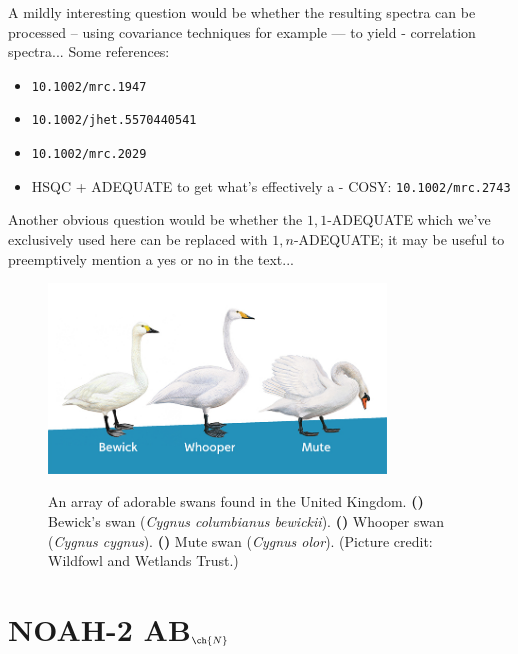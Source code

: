 \documentclass[a4paper,12pt]{article}
\newcommand{\carbon}{\ch{^{13}C}}
\newcommand{\nitrogen}{\ch{^{15}N}}
\newcommand{\todo}[1]{{\color{OrangeRed}#1}}
\begin{document}
\begin{refsection}
\todo{
    A mildly interesting question would be whether the resulting spectra can be processed -- using covariance techniques for example --- to yield \carbon{}-\nitrogen{} correlation spectra... Some references:

    \begin{itemize}
        \item \texttt{10.1002/mrc.1947}
        \item \texttt{10.1002/jhet.5570440541}
        \item \texttt{10.1002/mrc.2029}
        \item HSQC + ADEQUATE to get what's effectively a \carbon{}-\carbon{} COSY: \texttt{10.1002/mrc.2743}
    \end{itemize}

    Another obvious question would be whether the $1,1$-ADEQUATE which we've exclusively used here can be replaced with $1,n$-ADEQUATE; it may be useful to preemptively mention a yes or no in the text...
}

\begin{figure}[ht]
    \centering
    \includegraphics[width=0.8\textwidth]{swans.jpeg}
    {\label{fig:swans_bewick}}
    {\label{fig:swans_whooper}}
    {\label{fig:swans_mute}}
    \caption{
        An array of adorable swans found in the United Kingdom.
        \textbf{()} Bewick's swan (\textit{Cygnus columbianus bewickii}).
        \textbf{()} Whooper swan (\textit{Cygnus cygnus}).
        \textbf{()} Mute swan (\textit{Cygnus olor}).
        (Picture credit: Wildfowl and Wetlands Trust.)
    }
    \label{fig:swans}
\end{figure}

\section{NOAH-2 AB\texorpdfstring{$_{\ch{N}}$}{n}}


\end{refsection}
\end{document}
